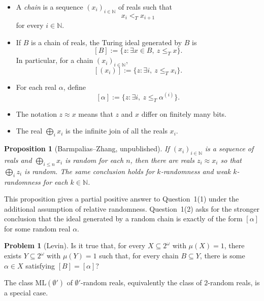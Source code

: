 \documentclass[11pt]{amsart}
\theoremstyle{definition}
\newtheorem{problem}{Problem}[section]
\newtheorem{proposition}[theorem]{Proposition}
\begin{document}
\begin{itemize}
    \item A \emph{chain} is a sequence $(x_i)_{i\in\mathbb{N}}$ of
    reals such that
    \[
        x_i<_T x_{i+1}
    \]
    for every $i\in\mathbb{N}$.

    \item If $B$ is a chain of reals, the Turing ideal generated by
    $B$ is
    \[
        [B]:=\{z:\exists x\in B,\ z\leq_T x\}.
    \]
    In particular, for a chain $(x_i)_{i\in\mathbb{N}}$,
    \[
        [(x_i)]
        :=
        \{z:\exists i,\ z\leq_T x_i\}.
    \]

    \item For each real $\alpha$, define
    \[
        [\alpha]
        :=
        \{z:\exists i,\ z\leq_T\alpha^{(i)}\}.
    \]

    \item The notation $z\approx x$ means that $z$ and $x$ differ
    on finitely many bits.

    \item The real
        $\bigoplus_i x_i$
    is the infinite join of all the reals $x_i$.
\end{itemize}

\medskip
\begin{proposition}[Barmpalias--Zhang, unpublished]
\textit{If $(x_i)_{i\in\mathbb{N}}$ is a sequence of reals and $\bigoplus_{i\leq n} x_i$ is random for each $n$, then there are reals
$z_i\approx x_i$ so that $\bigoplus_i z_i$ is random. The same conclusion holds for $k$-randomness and weak $k$-randomness for each $k\in \mathbb{N}$.}
\end{proposition}

This proposition gives a partial positive answer to Question~1(1) under
the additional assumption of relative randomness. Question~1(2) asks for
the stronger conclusion that the ideal generated by a random chain is
exactly of the form $[\alpha]$ for some random real $\alpha$.

\begin{problem}[Levin]
    Is it true that, for every $X\subseteq 2^\omega$ with $\mu(X)=1$,
    there exists $Y\subseteq 2^\omega$ with $\mu(Y)=1$ such that, for
    every chain $B\subseteq Y$, there is some $\alpha\in X$ satisfying
    $[B]=[\alpha]$?
  \end{problem}

The class $\mathrm{ML}(\emptyset')$
of $\emptyset'$-random reals, equivalently the class of $2$-random reals,
is a special case.
\end{document}
